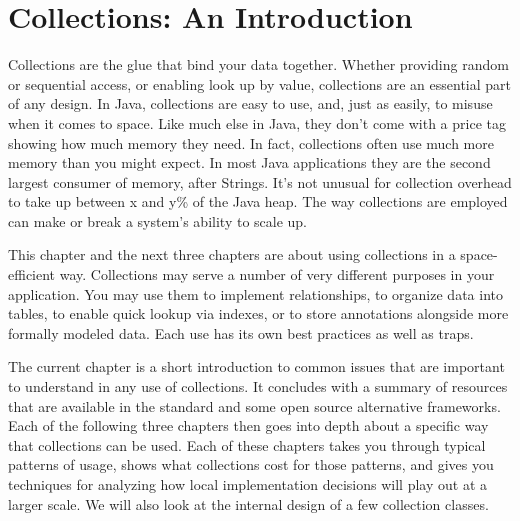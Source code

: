\chapter{Collections: An Introduction}
\label{chapter:brief-introduction-collections}

Collections are the glue that bind your data together.  Whether
providing random or sequential access, or enabling
look up by value, collections are an essential part of any
design. In Java, collections are easy to use, and, just as easily, to misuse when
it comes to space. Like much else in Java, they don't come with a price tag
showing how much memory they need. In fact, collections
often use much more memory than you might expect. In most Java applications they are the second largest consumer of memory, after
Strings. It's not unusual for collection overhead to take up between x and y\%
of the Java heap. The way collections are employed can make
or break a system's ability to scale up.

This chapter and the next three chapters are about using
collections in a space-efficient way. 
Collections may serve a number of very
different purposes in your application. You may use them to implement
relationships, to organize data into tables, to enable quick lookup via indexes, or
to store annotations alongside more formally modeled data. Each use
has its own best practices as well as traps. 

The current chapter
is a short introduction to common issues that are important to understand in
any use of collections. It concludes with a summary of resources
that are available in the standard and some open source alternative
frameworks. Each of the following three
chapters then goes into depth about a specific way that collections can be
used. Each of these chapters takes
you through typical patterns of usage, shows what collections cost for those patterns,
and gives you techniques for analyzing how local implementation decisions will play out at a larger scale. 
We will also look at the internal design of a few collection
classes.

%

